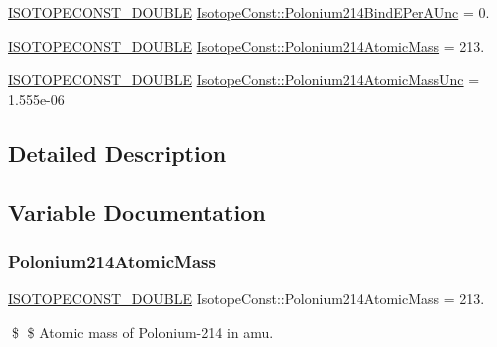 \begin{DoxyCompactItemize}
\mbox{\hyperlink{group___isotope_const-_macros_ga8f45a7272ce02c0b4c65c44636ed719a}{I\+S\+O\+T\+O\+P\+E\+C\+O\+N\+S\+T\+\_\+\+D\+O\+U\+B\+LE}} \mbox{\hyperlink{group___isotope_const-_polonium-_po214_ga24f0265b4905d1c2e9e9b27be3873517}{Isotope\+Const\+::\+Polonium214\+Bind\+E\+Per\+A\+Unc}} = 0.
\item 
\mbox{\hyperlink{group___isotope_const-_macros_ga8f45a7272ce02c0b4c65c44636ed719a}{I\+S\+O\+T\+O\+P\+E\+C\+O\+N\+S\+T\+\_\+\+D\+O\+U\+B\+LE}} \mbox{\hyperlink{group___isotope_const-_polonium-_po214_ga44c42486f995931d892be460a14a2928}{Isotope\+Const\+::\+Polonium214\+Atomic\+Mass}} = 213.
\item 
\mbox{\hyperlink{group___isotope_const-_macros_ga8f45a7272ce02c0b4c65c44636ed719a}{I\+S\+O\+T\+O\+P\+E\+C\+O\+N\+S\+T\+\_\+\+D\+O\+U\+B\+LE}} \mbox{\hyperlink{group___isotope_const-_polonium-_po214_ga5a6958a11f63d31e41d3c9e6e2b33784}{Isotope\+Const\+::\+Polonium214\+Atomic\+Mass\+Unc}} = 1.\+555e-\/06
\end{DoxyCompactItemize}


\subsection{Detailed Description}


\subsection{Variable Documentation}
\mbox{\label{group___isotope_const-_polonium-_po214_ga44c42486f995931d892be460a14a2928}} 
\subsubsection{\texorpdfstring{Polonium214\+Atomic\+Mass}{Polonium214AtomicMass}}
{\footnotesize\ttfamily \mbox{\hyperlink{group___isotope_const-_macros_ga8f45a7272ce02c0b4c65c44636ed719a}{I\+S\+O\+T\+O\+P\+E\+C\+O\+N\+S\+T\+\_\+\+D\+O\+U\+B\+LE}} Isotope\+Const\+::\+Polonium214\+Atomic\+Mass = 213.}

\$ \$ Atomic mass of Polonium-\/214 in amu. \mbox{\label{group___isotope_const-_polonium-_po214_ga5a6958a11f63d31e41d3c9e6e2b33784}} 

